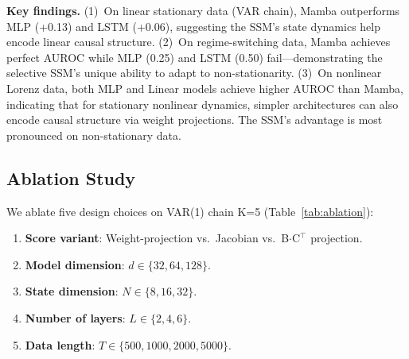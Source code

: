 \textbf{Key findings.} (1)~On linear stationary data (VAR chain),
Mamba outperforms MLP (+0.13) and LSTM (+0.06), suggesting the SSM's
state dynamics help encode linear causal structure. (2)~On
regime-switching data, Mamba achieves perfect AUROC while MLP (0.25)
and LSTM (0.50) fail---demonstrating the selective SSM's unique ability
to adapt to non-stationarity. (3)~On nonlinear Lorenz data, both MLP
and Linear models achieve higher AUROC than Mamba, indicating that for
stationary nonlinear dynamics, simpler architectures can also encode
causal structure via weight projections. The SSM's advantage is most
pronounced on non-stationary data.

\subsection{Ablation Study}
\label{sec:ablation}

We ablate five design choices on VAR(1) chain K=5
(Table~\ref{tab:ablation}):

\begin{enumerate}[leftmargin=1.5em, topsep=0pt, itemsep=0pt]
    \item \textbf{Score variant}: Weight-projection vs.\ Jacobian vs.\
    B$\cdot$C$^\top$ projection.
    \item \textbf{Model dimension}: $d \in \{32, 64, 128\}$.
    \item \textbf{State dimension}: $N \in \{8, 16, 32\}$.
    \item \textbf{Number of layers}: $L \in \{2, 4, 6\}$.
    \item \textbf{Data length}: $T \in \{500, 1000, 2000, 5000\}$.
\end{enumerate}


